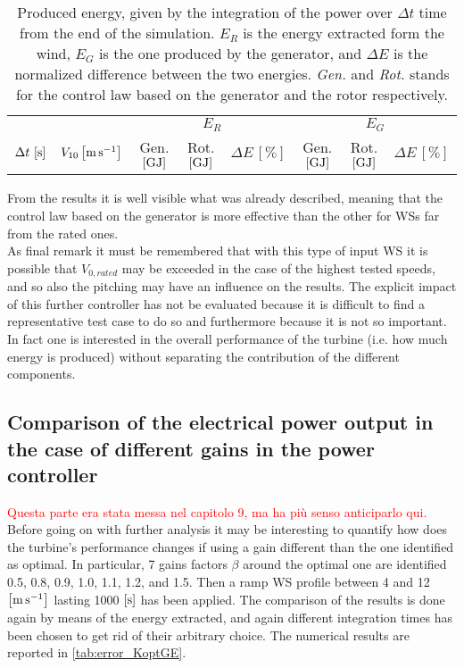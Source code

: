 \begin{table}[htb]
  \centering
  \caption{Produced energy, given by the integration of the power over $\Delta t$ time from the end of the simulation. $E_R$ is the energy extracted form the wind, $E_G$ is the one produced by the generator, and $\Delta E$ is the normalized difference between the two energies. \textit{Gen.} and \textit{Rot.} stands for the control law based on the generator and the rotor respectively.}
  \begin{tabular}{cc|ccc|ccc}
    \toprule
    & & \multicolumn{3}{c}{$E_R$} & \multicolumn{3}{|c}{$E_G$} \\
     $\Delta t \,\left[\si{\second}\right]$ &  $V_{10} \left[\si{\meter\per\second}\right]$ & Gen. $\left[\si{\giga\joule}\right]$ & Rot. $\left[\si{\giga\joule}\right]$ & $\Delta E \, \left[\%\right]$ & Gen. $\left[\si{\giga\joule}\right]$ & Rot. $\left[\si{\giga\joule}\right]$ & $\Delta E \, \left[\%\right]$ \\ \midrule
    
  \end{tabular}
  \label{tab:energy_K_opt_comp}
\end{table}

From the results it is well visible what was already described, meaning that the control law based on the generator is more effective than the other for WSs far from the rated ones. \\
As final remark it must be remembered that with this type of input WS it is possible that $V_{0,rated}$ may be exceeded in the case of the highest tested speeds, and so also the pitching may have an influence on the results. The explicit impact of this further controller has not be evaluated because it is difficult to find a representative test case to do so and furthermore because it is not so important. In fact one is interested in the overall performance of the turbine (i.e. how much energy is produced) without separating the contribution of the different components. 

\subsection{Comparison of the electrical power output in the case of different gains in the power controller}\label{subsec:c_different_KoptGE}
\textcolor{red}{Questa parte era stata messa nel capitolo 9, ma ha più senso anticiparlo qui.}
Before going on with further analysis it may be interesting to quantify how does the turbine's performance changes if using a gain different than the one identified as optimal. In particular, 7 gains factors $\beta$ around the optimal one are identified 0.5, 0.8, 0.9, 1.0, 1.1, 1.2, and 1.5. Then a ramp WS profile between 4 and 12 $\left[\si{\meter\per\second}\right]$ lasting 1000 $\left[\si{\second}\right]$ has been applied. The comparison of the results is done again by means of the energy extracted, and again different integration times has been chosen to get rid of their arbitrary choice. The numerical results are reported in \autoref{tab:error_KoptGE}. 

